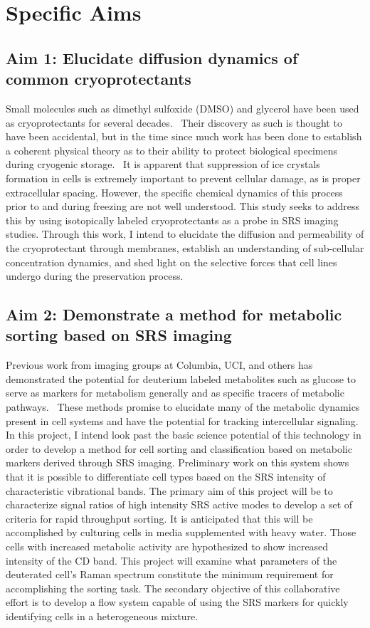 \section{Specific Aims}
\subsection{Aim 1: Elucidate diffusion dynamics of common cryoprotectants}
Small molecules such as dimethyl sulfoxide (DMSO) and glycerol have been used as cryoprotectants for several decades.~\cite{Pegg:2002aa}  Their discovery as such is thought to have been accidental, but in the time since much work has been done to establish a coherent physical theory as to their ability to protect biological specimens during cryogenic storage.~\cite{Pegg2007}  It is apparent that suppression of ice crystals formation in cells is extremely important to prevent cellular damage, as is proper extracellular spacing.  However, the specific chemical dynamics of this process prior to and during freezing are not well understood.  This study seeks to address this by using isotopically labeled cryoprotectants as a probe in SRS imaging studies.  Through this work, I intend to elucidate the diffusion and permeability of the cryoprotectant through membranes, establish an understanding of sub-cellular concentration dynamics, and shed light on the selective forces that cell lines undergo during the preservation process.

\subsection{Aim 2: Demonstrate a method for metabolic sorting based on SRS imaging }
Previous work from imaging groups at Columbia, UCI, and others has demonstrated the potential for deuterium labeled metabolites such as glucose to serve as markers for metabolism generally and as specific tracers of metabolic pathways.~\cite{Hou2503, Shi:2018aa, Shi:2018ab} These methods promise to elucidate many of the metabolic dynamics present in cell systems and have the potential for tracking intercellular signaling.  In this project, I intend look past the basic science potential of this technology in order to develop a method for cell sorting and classification based on metabolic markers derived through SRS imaging.  Preliminary work on this system shows that it is possible to differentiate cell types based on the SRS intensity of characteristic vibrational bands. The primary aim of this project will be to characterize signal ratios of high intensity SRS active modes to develop a set of criteria for rapid throughput sorting.  It is anticipated that this will be accomplished by culturing cells in media supplemented with heavy water.  Those cells with increased metabolic activity are hypothesized to show increased intensity of the CD band.  This project will examine what parameters of the deuterated cell's Raman spectrum constitute the minimum requirement for accomplishing the sorting task.  The secondary objective of this collaborative effort is to develop a flow system capable of using the SRS markers for quickly identifying cells in a heterogeneous mixture.

